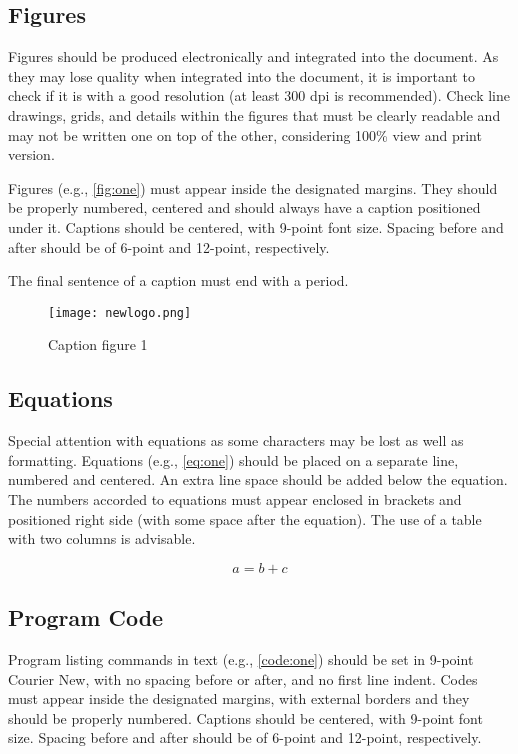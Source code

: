 \documentclass[english, spanish, brazilian]{RBIEarticle} %
\begin{document}
\subsection{Figures}
Figures should be produced electronically and integrated into the document. As they may lose quality when integrated into the document, it is important to check if it is with a good resolution (at least 300 dpi is recommended). Check line drawings, grids, and details within the figures that must be clearly readable and may not be written one on top of the other, considering 100\% view and print version.

Figures (e.g., \autoref{fig:one}) must appear inside the designated margins. They should be properly numbered, centered and should always have a caption positioned under it. Captions should be centered, with 9-point font size. Spacing before and after should be of 6-point and 12-point, respectively.

The final sentence of a caption must end with a period. 

\begin{figure}[h]
	\centerline{\texttt{[image: newlogo.png]}}
	\caption{Caption figure 1}
	\label{fig:one}
\end{figure}


\subsection{Equations}
Special attention with equations as some characters may be lost as well as formatting. Equations (e.g., \autoref{eq:one}) should be placed on a separate line, numbered and centered. An extra line space should be added below the equation. The numbers accorded to equations must appear enclosed in brackets and positioned right side (with some space after the equation).
The use of a table with two columns is advisable.

\begin{equation}
	a = b + c
	\label{eq:one}
\end{equation}


\subsection{Program Code}
Program listing commands in text (e.g., \autoref{code:one}) should be set in 9-point Courier New, with no spacing before or after, and no first line indent. Codes must appear inside the designated margins, with external borders and they should be properly numbered. Captions should be centered, with 9-point font size. Spacing before and after should be of 6-point and 12-point, respectively.
\end{document}
